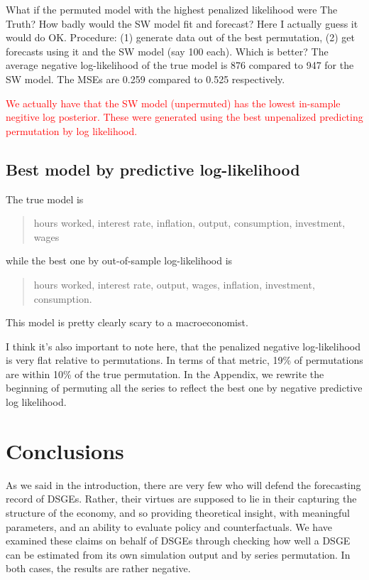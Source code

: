 \documentclass[11pt]{article}
\newcommand{\attn}[1]{\textcolor{red}{#1}}
\begin{document}
What if the permuted model with the highest penalized likelihood were
The Truth? How badly would the SW model fit and forecast? Here I
actually guess it would do OK. Procedure: (1) generate data out of the
best permutation, (2) get forecasts using it and the SW model (say 100
each). Which is better? The average negative log-likelihood of the true
model is 876 compared to 947 for the SW model. The MSEs are 0.259
compared to 0.525 respectively.

\attn{We actually have that the SW model (unpermuted) has the lowest in-sample negitive log posterior. These were generated using the best unpenalized predicting permutation by log likelihood.}

\hypertarget{best-model-by-predictive-log-likelihood}{%
\subsection{Best model by predictive
log-likelihood}\label{best-model-by-predictive-log-likelihood}}

The true model is

\begin{quotation}
hours worked, interest rate, inflation, output, consumption, investment, wages
\end{quotation}

\noindent while the best one by out-of-sample log-likelihood is

\begin{quotation}
hours worked, interest rate, output, wages, inflation, investment, consumption.
\end{quotation}

\noindent This model is pretty clearly scary to a macroeconomist.

I think it's also important to note here, that the penalized negative
log-likelihood is very flat relative to permutations. In terms of that
metric, 19\% of permutations are within 10\% of the true permutation. In
the Appendix, we rewrite the beginning of \citet{SmetsWouters2007}
permuting all the series to reflect the best one by negative predictive
log likelihood.

\hypertarget{conclusions}{%
\section{Conclusions}\label{conclusions}}

As we said in the introduction, there are very few who will defend the
forecasting record of DSGEs. Rather, their virtues are supposed to lie
in their capturing the structure of the economy, and so providing
theoretical insight, with meaningful parameters, and an ability to
evaluate policy and counterfactuals. We have examined these claims on
behalf of DSGEs through checking how well a DSGE can be estimated from
its own simulation output and by series permutation. In both cases, the
results are rather negative.
\end{document}
